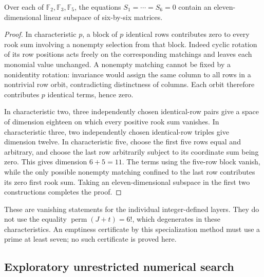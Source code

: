 \begin{proposition}
Over each of $\mathbb F_2,\mathbb F_3,\mathbb F_5$, the equations $S_1=\cdots=S_6=0$ contain an eleven-dimensional linear subspace of six-by-six matrices.
\end{proposition}
\begin{proof}
In characteristic $p$, a block of $p$ identical rows contributes zero to every rook sum involving a nonempty selection from that block.
Indeed cyclic rotation of its row positions acts freely on the corresponding matchings and leaves each monomial value unchanged.
A nonempty matching cannot be fixed by a nonidentity rotation: invariance would assign the same column to all rows in a nontrivial row orbit, contradicting distinctness of columns.
Each orbit therefore contributes $p$ identical terms, hence zero.

In characteristic two, three independently chosen identical-row pairs give a space of dimension eighteen on which every positive rook sum vanishes.
In characteristic three, two independently chosen identical-row triples give dimension twelve.
In characteristic five, choose the first five rows equal and arbitrary, and choose the last row arbitrarily subject to its coordinate sum being zero. This gives dimension $6+5=11$.
The terms using the five-row block vanish, while the only possible nonempty matching confined to the last row contributes its zero first rook sum.
Taking an eleven-dimensional subspace in the first two constructions completes the proof.
\end{proof}

These are vanishing statements for the individual integer-defined layers. They do not use the equality $\operatorname{perm}(J+t)=6!$, which degenerates in these characteristics. An emptiness certificate by this specialization method must use a prime at least seven; no such certificate is proved here.

\subsection{Exploratory unrestricted numerical search}

